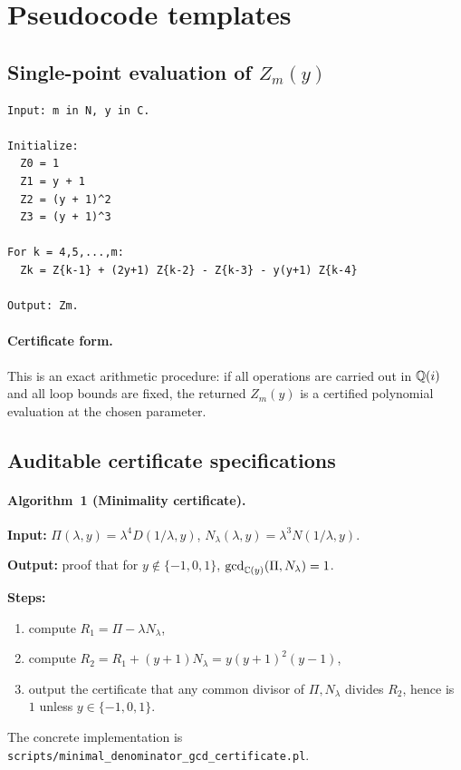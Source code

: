 ﻿\section{Pseudocode templates}\label{app:pseudocode}

\subsection{Single-point evaluation of \texorpdfstring{$Z_m(y)$}{Z\_m(y)}}

\begin{verbatim}
Input: m in N, y in C.

Initialize:
  Z0 = 1
  Z1 = y + 1
  Z2 = (y + 1)^2
  Z3 = (y + 1)^3

For k = 4,5,...,m:
  Zk = Z{k-1} + (2y+1) Z{k-2} - Z{k-3} - y(y+1) Z{k-4}

Output: Zm.
\end{verbatim}
\paragraph{Certificate form.}
This is an exact arithmetic procedure: if all operations are carried out in \(\mathbb{Q}(i)\) and all loop bounds are fixed, the returned \(Z_m(y)\) is a certified polynomial evaluation at the chosen parameter.

\subsection{Auditable certificate specifications}

\paragraph{Algorithm~1 (Minimality certificate).}
\textbf{Input:} \(\Pi(\lambda,y)=\lambda^4D(1/\lambda,y)\), \(N_\lambda(\lambda,y)=\lambda^3N(1/\lambda,y)\).\par
\textbf{Output:} proof that for \(y\notin\{-1,0,1\}\), \(\gcd_{\mathbb{C}(y)}(\Pi,N_\lambda)=1\).\par
\textbf{Steps:}
\begin{enumerate}
  \item compute \(R_1=\Pi-\lambda N_\lambda\),
  \item compute \(R_2=R_1+(y+1)N_\lambda=y(y+1)^2(y-1)\),
  \item output the certificate that any common divisor of \(\Pi,N_\lambda\) divides \(R_2\), hence is \(1\) unless \(y\in\{-1,0,1\}\).
\end{enumerate}
The concrete implementation is
\texttt{scripts/minimal\_denominator\_gcd\_certificate.pl}.

